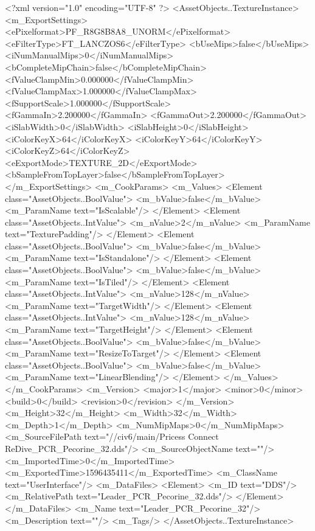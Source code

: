 <?xml version="1.0" encoding="UTF-8" ?>
<AssetObjects..TextureInstance>
	<m_ExportSettings>
		<ePixelformat>PF_R8G8B8A8_UNORM</ePixelformat>
		<eFilterType>FT_LANCZOS6</eFilterType>
		<bUseMips>false</bUseMips>
		<iNumManualMips>0</iNumManualMips>
		<bCompleteMipChain>false</bCompleteMipChain>
		<fValueClampMin>0.000000</fValueClampMin>
		<fValueClampMax>1.000000</fValueClampMax>
		<fSupportScale>1.000000</fSupportScale>
		<fGammaIn>2.200000</fGammaIn>
		<fGammaOut>2.200000</fGammaOut>
		<iSlabWidth>0</iSlabWidth>
		<iSlabHeight>0</iSlabHeight>
		<iColorKeyX>64</iColorKeyX>
		<iColorKeyY>64</iColorKeyY>
		<iColorKeyZ>64</iColorKeyZ>
		<eExportMode>TEXTURE_2D</eExportMode>
		<bSampleFromTopLayer>false</bSampleFromTopLayer>
	</m_ExportSettings>
	<m_CookParams>
		<m_Values>
			<Element class="AssetObjects..BoolValue">
				<m_bValue>false</m_bValue>
				<m_ParamName text="IsScalable"/>
			</Element>
			<Element class="AssetObjects..IntValue">
				<m_nValue>2</m_nValue>
				<m_ParamName text="TexturePadding"/>
			</Element>
			<Element class="AssetObjects..BoolValue">
				<m_bValue>false</m_bValue>
				<m_ParamName text="IsStandalone"/>
			</Element>
			<Element class="AssetObjects..BoolValue">
				<m_bValue>false</m_bValue>
				<m_ParamName text="IsTiled"/>
			</Element>
			<Element class="AssetObjects..IntValue">
				<m_nValue>128</m_nValue>
				<m_ParamName text="TargetWidth"/>
			</Element>
			<Element class="AssetObjects..IntValue">
				<m_nValue>128</m_nValue>
				<m_ParamName text="TargetHeight"/>
			</Element>
			<Element class="AssetObjects..BoolValue">
				<m_bValue>false</m_bValue>
				<m_ParamName text="ResizeToTarget"/>
			</Element>
			<Element class="AssetObjects..BoolValue">
				<m_bValue>false</m_bValue>
				<m_ParamName text="LinearBlending"/>
			</Element>
		</m_Values>
	</m_CookParams>
	<m_Version>
		<major>1</major>
		<minor>0</minor>
		<build>0</build>
		<revision>0</revision>
	</m_Version>
	<m_Height>32</m_Height>
	<m_Width>32</m_Width>
	<m_Depth>1</m_Depth>
	<m_NumMipMaps>0</m_NumMipMaps>
	<m_SourceFilePath text="//civ6/main/Pricess Connect ReDive\Textures\Leader_PCR_Pecorine_32.dds"/>
	<m_SourceObjectName text=""/>
	<m_ImportedTime>0</m_ImportedTime>
	<m_ExportedTime>1596435411</m_ExportedTime>
	<m_ClassName text="UserInterface"/>
	<m_DataFiles>
		<Element>
			<m_ID text="DDS"/>
			<m_RelativePath text="Leader_PCR_Pecorine_32.dds"/>
		</Element>
	</m_DataFiles>
	<m_Name text="Leader_PCR_Pecorine_32"/>
	<m_Description text=""/>
	<m_Tags/>
</AssetObjects..TextureInstance>

